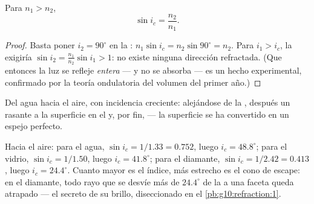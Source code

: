 \begin{proposition}\label{prop:g10:refraction:criticalformula}
Para $n_1 > n_2$,
\[
\sin i_c = \frac{n_2}{n_1} .
\]
\end{proposition}

\begin{proof}
Basta poner $i_2 = 90^\circ$ en la :
$n_1 \sin i_c = n_2 \sin 90^\circ = n_2$. Para $i_1 > i_c$, la  exigiría $\sin i_2 = \frac{n_1}{n_2}\sin i_1 > 1$: no existe
ninguna dirección refractada. (Que entonces la luz se refleje
\emph{entera} --- y no se absorba --- es un hecho experimental,
confirmado por la teoría ondulatoria del volumen del primer año.)
\end{proof}

\begin{omfigure}

{\small Del agua hacia el aire, con incidencia creciente: 
alejándose de la , después un  rasante a la
superficie en el  y, por fin,  ---
la superficie se ha convertido en un espejo perfecto.}
\end{omfigure}

\begin{example}\label{ex:g10:refraction:criticalvalues}
Hacia el aire: para el agua, $\sin i_c = 1/1.33 = 0.752$, luego
$i_c = 48.8^\circ$; para el vidrio, $\sin i_c = 1/1.50$, luego
$i_c = 41.8^\circ$; para el diamante, $\sin i_c = 1/2.42 = 0.413$, luego
$i_c = 24.4^\circ$. Cuanto mayor es el índice, más estrecho es el cono
de escape: en el diamante, todo rayo que se desvíe más de $24.4^\circ$
de la  a una faceta queda atrapado --- el secreto de su brillo,
diseccionado en el \cref{pb:g10:refraction:1}.
\end{example}

